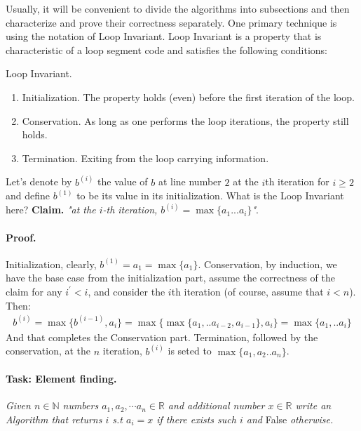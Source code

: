 Usually, it will be convenient to divide the algorithms into subsections and then characterize and prove their correctness separately. One primary technique is using the notation of Loop Invariant. Loop Invariant is a property that is characteristic of a loop segment code  and satisfies the following conditions:
\begin{defbox}{Loop Invariant.} 
\begin{enumerate}
  \item Initialization. The property holds (even) before the first iteration of the loop.    
    \item Conservation. As long as one performs the loop iterations, the property still holds.
    \item Termination. Exiting from the loop carrying information.
\end{enumerate}
\end{defbox}

Let's denote by $b^{(i)}$ the value of $b$ at line number $2$ at the $i$th iteration for $i\ge2$ and define $b^{(1)}$ to be its value in its initialization. What is the Loop Invariant here? \textbf{Claim.} \textit{"at the \(i\)-th iteration, $b^{(i)} = \max{ \{ a_1 ... a_{i} \} } $"}. 
\paragraph{Proof.} Initialization, clearly, $ b^{(1)} = a_{1} = \max{ \{ a_1 \} } $. Conservation, by induction, we have the base case from the initialization part, assume the correctness of the claim for any $i^\prime < i$, and consider the $i$th iteration (of course, assume that $i<n$). Then:  
\begin{equation*}
  \begin{split}
b^{(i)} = \max{ \{ b^{(i-1)}, a_{i} \} } = \max{ \{ \max{ \{ a_1, .. a_{i-2}, a_{i-1} \} }, a_{i} \} } = \max{ \{  a_{1}, .. a_{i} \} }
  \end{split}
\end{equation*} 
And that completes the Conservation part. Termination, followed by the conservation, at the $n$ iteration, $b^{(i)}$ is seted to $\max{ \{ a_1 ,a_2 .. a_n  \}}$. 

\paragraph{Task: Element finding.}  \textit{Given $n\in \mathbb{N}$ numbers $a_1, a_2, \cdots a_n \in \mathbb{R}$ and additional number $x \in \mathbb{R}$ write an Algorithm that returns $i$ s.t $a_{i} = x$ if there exists such $i$ and} False \textit{otherwise.} 


